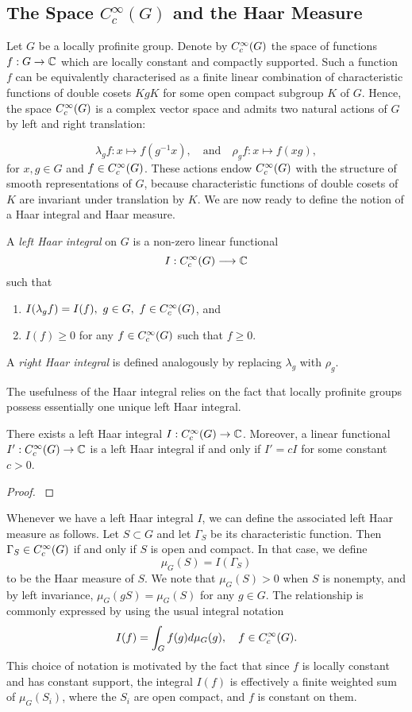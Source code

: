 \subsection{The Space \texorpdfstring{$C_c^{\infty}(G)$}{TEXT} and the Haar Measure}

Let $G$ be a locally profinite group. Denote by $C_c^{\infty}(G)$ the space of functions $f:G\to\mathbb{C}$ which are locally constant and compactly supported. Such a function $f$ can be equivalently characterised as a finite linear combination of characteristic functions of double cosets $KgK$ for some open compact subgroup $K$ of $G$. Hence, the space $C_c^{\infty}(G)$ is a complex vector space and admits two natural actions of $G$ by left and right translation:

$$\lambda_g f:x\longmapsto f(g^{-1}x),\quad\text{and}\quad \rho_g f:x\longmapsto f(xg),$$
for $x,g\in G$ and $f\in C_c^{\infty}(G)$. These actions endow $C_c^{\infty}(G)$ with the structure of smooth representations of $G$, because characteristic functions of double cosets of $K$ are invariant under translation by $K$. We are now ready to define the notion of a Haar integral and Haar measure.

\begin{defn}
    A \textit{left Haar integral} on $G$ is a non-zero linear functional 
    $$I:C_c^{\infty}(G)\longrightarrow \mathbb{C}$$
    such that
    \begin{enumerate}[(1)]
        \item $I(\lambda_g f)=I(f),\ g\in G,\ f\in\CG$, and
        \item $I(f)\geq 0$ for any $f\in C_c^{\infty}(G)$ such that $f\geq 0$.
    \end{enumerate}
    A \textit{right Haar integral} is defined analogously by replacing $\lambda_g$ with $\rho_g$.
\end{defn}

The usefulness of the Haar integral relies on the fact that locally profinite groups possess essentially one unique left Haar integral.

\begin{prop}\label{prop:haar}
    There exists a left Haar integral $I:C_c^{\infty}(G)\to\mathbb{C}$. Moreover, a linear functional $I':C_c^{\infty}(G)\to\mathbb{C}$ is a left Haar integral if and only if $I'=cI$ for some constant $c>0$.
\end{prop}
\begin{proof}
    \cite[Proposition 3.1]{BH1}
\end{proof}

Whenever we have a left Haar integral $I$, we can define the associated left Haar measure as follows. Let $S\subset G$ and let $\Gamma_S$ be its characteristic function. Then $\Gamma_S\in C_c^{\infty}(G)$ if and only if $S$ is open and compact. In that case, we define $$\mu_G(S)=I(\Gamma_S)$$ to be the Haar measure of $S$. We note that $\mu_G(S)>0$ when $S$ is nonempty, and by left invariance, $\mu_G(gS)=\mu_G(S)$ for any $g\in G$. The relationship is commonly expressed by using the usual integral notation
$$I(f)=\int_G f(g)d\mu_G(g),\quad f\in C_c^{\infty}(G).$$
This choice of notation is motivated by the fact that since $f$ is locally constant and has constant support, the integral $I(f)$ is effectively a finite weighted sum of $\mu_G(S_i)$, where the $S_i$ are open compact, and $f$ is constant on them. 

